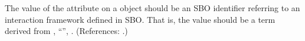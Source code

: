 The value of the attribute  on a \Model object should be an
SBO identifier referring to an interaction  framework defined in SBO.  That
is, the value should be a term derived from \sbointeractionID,
``'', .  (References: .)
